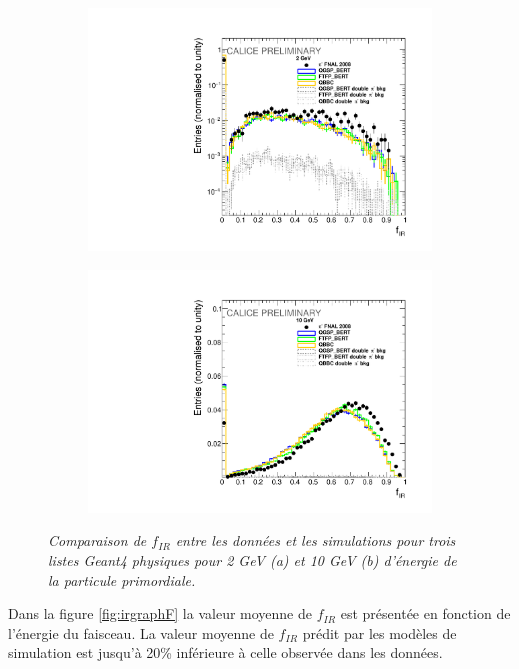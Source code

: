\begin{figure}
	\centering
	\begin{subfigure}{0.5\textwidth}
		\centering
		\includegraphics[width=.90\linewidth]{ECAL/plots/e-ir-2.pdf}
		\caption{\label{fig:efr2F} }
	\end{subfigure}%
	\begin{subfigure}{0.5\textwidth}
		\centering
		\includegraphics[width=.90\linewidth]{ECAL/plots/e-ir-10.pdf}
		\caption{\label{fig:efr10F} }
	\end{subfigure}
	\caption{\label{fig:irexampleF} \sl%
		Comparaison de $f_{IR}$ entre les données et les simulations pour trois listes {\sc Geant}4 physiques pour 2 GeV (a) et 10 GeV (b) d'énergie de la particule primordiale.}
\end{figure}

Dans la figure \ref{fig:irgraphF} la valeur moyenne de $f_ {IR}$ est présentée en fonction de l'énergie du faisceau.%
La valeur moyenne de $f_{IR}$ prédit par les modèles de simulation est jusqu'à 20\% inférieure à celle observée dans les données.

